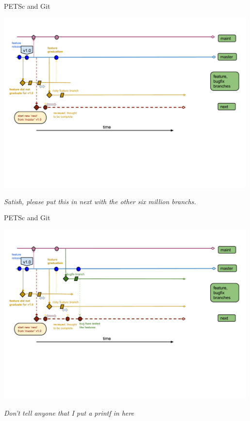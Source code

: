 \begin{frame}{PETSc and Git}
  \begin{center}
    \includegraphics[width=0.99\textwidth]{figures/gitworkflows-65}
  \end{center}
  \begin{flushright} \vspace*{-0.5cm}
   \textit{Satish, please put this in next with the other six million branchs.}
  \end{flushright}
\end{frame}

\begin{frame}{PETSc and Git}
  \begin{center}
    \includegraphics[width=0.99\textwidth]{figures/gitworkflows-70}
  \end{center}
  \begin{flushright} \vspace*{-0.5cm}
   \textit{Don't tell anyone that I put a printf in here}
  \end{flushright}
\end{frame}

